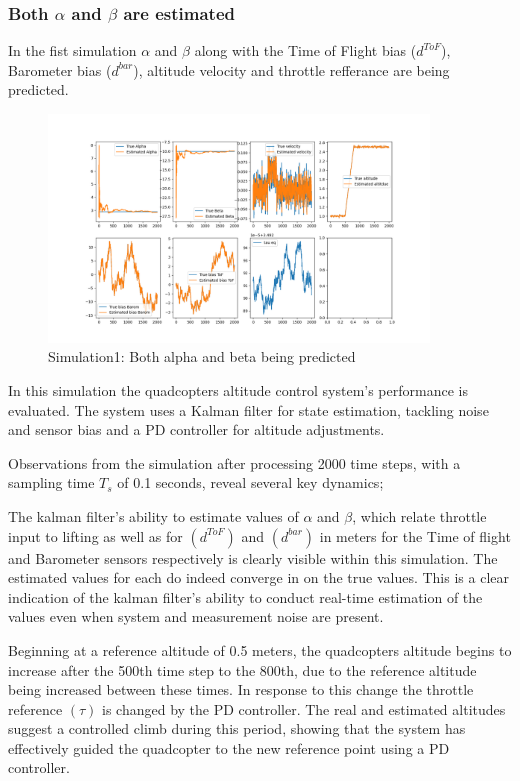 \documentclass{article}
\begin{document}
\subsubsection*{Both \(\alpha\) and \(\beta\) are estimated}
In the fist simulation \(\alpha\) and \(\beta\) along with the Time of Flight
bias (\(d^{ToF}\)), Barometer bias (\(d^{bar}\)), altitude velocity and throttle
refferance are being predicted.
\begin{figure}[H]
  \centering
  \includegraphics[width=0.9\textwidth]{Pictures/no_constant_PD.png}
  \caption{Simulation1: Both alpha and beta being predicted}
  \label{fig:no_constant_PD}
\end{figure}
In this simulation the quadcopters altitude control system's performance is
evaluated. The system uses a Kalman filter for state estimation, tackling noise
and sensor bias and a PD controller for altitude adjustments.

Observations from the simulation after processing 2000 time steps, with a
sampling time \(T_s\) of 0.1 seconds, reveal several key dynamics;

The kalman filter’s ability to estimate values of \(\alpha\) and \(\beta\),
which relate throttle input to lifting as well as for \((d^{ToF})\) and
\((d^{bar})\) in meters for the Time of flight and Barometer sensors
respectively is clearly visible within this simulation. The estimated values for
each do indeed converge in on the true values. This is a clear indication of the
kalman filter’s ability to conduct real-time estimation of the values even when
system and measurement noise are present.

Beginning at a reference altitude of 0.5 meters, the quadcopters altitude begins
to increase after the 500th time step to the 800th, due to the reference
altitude being increased between these times. In response to this change the
throttle reference \((\tau)\) is changed by the PD controller. The real and
estimated altitudes suggest a controlled climb during this period, showing that
the system has effectively guided the quadcopter to the new reference point
using a PD controller.
\end{document}
